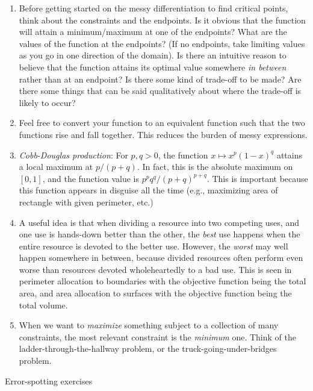 \documentclass[10pt]{amsart}
\begin{document}
\begin{enumerate}
\item Before getting started on the messy differentiation to find
  critical points, think about the constraints and the endpoints. Is
  it obvious that the function will attain a minimum/maximum at one of
  the endpoints? What are the values of the function at the endpoints?
  (If no endpoints, take limiting values as you go in one direction of
  the domain). Is there an intuitive reason to believe that the
  function attains its optimal value somewhere {\em in between} rather
  than at an endpoint? Is there some kind of trade-off to be made? Are
  there some things that can be said qualitatively about where the
  trade-off is likely to occur?
\item Feel free to convert your function to an equivalent function
  such that the two functions rise and fall together. This reduces the
  burden of messy expressions.
\item {\em Cobb-Douglas production}: For $p,q > 0$, the function $x
  \mapsto x^p(1 - x)^q$ attains a local maximum at $p/(p + q)$. In
  fact, this is the absolute maximum on $[0,1]$, and the function
  value is $p^pq^q/(p + q)^{p + q}$. This is important because this function
  appears in disguise all the time (e.g., maximizing area of rectangle
  with given perimeter, etc.)
\item A useful idea is that when dividing a resource into two
  competing uses, and one use is hands-down better than the other, the
  {\em best} use happens when the entire resource is devoted to the
  better use. However, the {\em worst} may well happen somewhere in
  between, because divided resources often perform even worse than
  resources devoted wholeheartedly to a bad use. This is seen in
  perimeter allocation to boundaries with the objective function being
  the total area, and area allocation to surfaces with the objective
  function being the total volume.
\item When we want to {\em maximize} something subject to a collection
  of many constraints, the most relevant constraint is the {\em
  minimum} one. Think of the ladder-through-the-hallway problem, or
  the truck-going-under-bridges problem. 
\end{enumerate}

Error-spotting exercises
\end{document}
